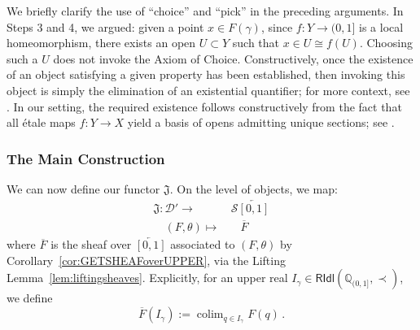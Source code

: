 \documentclass[a4paper, 11pt,reqno]{amsart}
\newcommand{\MING}[1]{{\color{blue} {\tiny \bf (M:)} {\bf #1}}}
\newcommand{\qint}{\mathbb{Q}_{(0,1]}}
\newcommand{\RIdl}{\mathsf{RIdl}}
\DeclareMathOperator*{\colim}{colim}
\begin{document}
\begin{discussion} We briefly clarify the use of ``choice'' and ``pick'' in the preceding arguments. In Steps 3 and 4, we argued: given a point $x\in F(\gamma)$, since $f\colon Y\to (0,1]$ is a local homeomorphism, there exists an open $U\subset Y$ such that $x\in U\cong f(U)$. Choosing such a $U$ does not invoke the Axiom of Choice. Constructively, once the existence of an object satisfying a given property has been established, then invoking this object is simply the elimination of an existential quantifier; for more context, see \cite[\S 1.3]{BauerConstructive}. In our setting, the required existence follows constructively from the fact that all \'{e}tale maps $f\colon Y\to X$ yield a basis of opens admitting unique sections; see \cite[Proposition 1.49]{Vi07}. 
	
	
\end{discussion}


\subsubsection*{The Main Construction} We can now define our functor $\mathfrak{J}$. On the level of objects, we map:
\begin{align*}
\mathfrak{J}\colon \mathcal{D}' \longrightarrow & \,\mathcal{S}\overleftarrow{[0,1]}\\
\quad (F,\theta)  \mapsto & \quad  \overline{F}
\end{align*}
where $\overline{F}$ is the sheaf over $\overleftarrow{[0,1]}$ associated to $(F,\theta)$ by Corollary~\ref{cor:GETSHEAFoverUPPER}, via the Lifting Lemma~\ref{lem:liftingsheaves}. Explicitly, for an upper real $I_{\gamma}\in \RIdl (\qint,\prec)$, we define 
$$\overline{F}(I_{\gamma}):=\colim_{q\in I_{\gamma}}F(q)\,.$$
\end{document}

